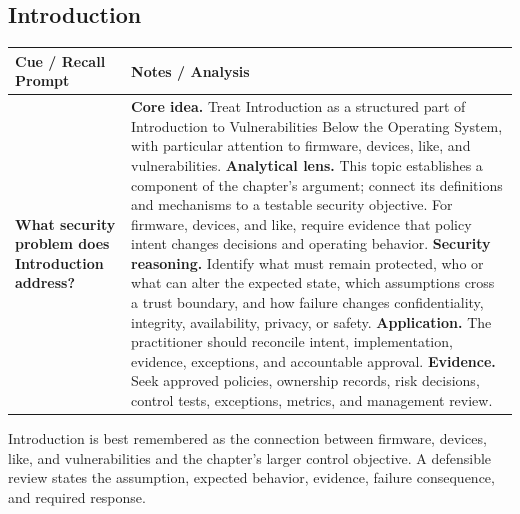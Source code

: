\documentclass[11pt]{article}
\newcommand{\CornellHeader}{%
\rowcolor{Navy}\color{white}\bfseries Cue / Recall Prompt & \color{white}\bfseries Notes / Analysis\\\hline}
\newcommand{\CornellRow}[2]{%
\cellcolor{CueGray}\RaggedRight\textbf{#1} & \RaggedRight #2\\\hline}
\begin{document}
\subsection*{Introduction}
\begin{longtable}{>{\RaggedRight\arraybackslash}p{}|>{\RaggedRight\arraybackslash}p{}}
\CornellHeader
\CornellRow{What security problem does Introduction address?}{\textbf{Core idea.} Treat Introduction as a structured part of Introduction to Vulnerabilities Below the Operating System, with particular attention to firmware, devices, like, and vulnerabilities. \textbf{Analytical lens.} This topic establishes a component of the chapter's argument; connect its definitions and mechanisms to a testable security objective. For firmware, devices, and like, require evidence that policy intent changes decisions and operating behavior. \textbf{Security reasoning.} Identify what must remain protected, who or what can alter the expected state, which assumptions cross a trust boundary, and how failure changes confidentiality, integrity, availability, privacy, or safety. \textbf{Application.} The practitioner should reconcile intent, implementation, evidence, exceptions, and accountable approval. \textbf{Evidence.} Seek approved policies, ownership records, risk decisions, control tests, exceptions, metrics, and management review.}
\end{longtable}
\begin{topicsummary}
Introduction is best remembered as the connection between firmware, devices, like, and vulnerabilities and the chapter's larger control objective. A defensible review states the assumption, expected behavior, evidence, failure consequence, and required response.
\end{topicsummary}
\end{document}
